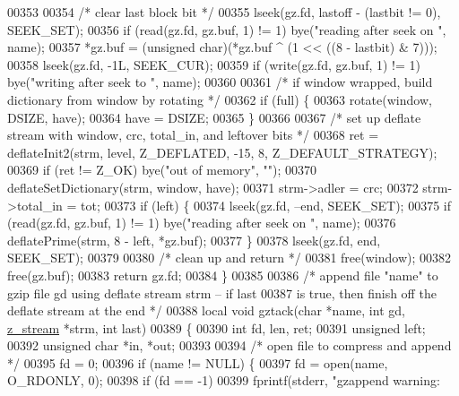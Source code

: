 \begin{DoxyCode}
{00353 
00354     \textcolor{comment}{/* clear last block bit */}
00355     lseek(gz.fd, lastoff - (lastbit != 0), SEEK\_SET);
00356     \textcolor{keywordflow}{if} (read(gz.fd, gz.buf, 1) != 1) bye(\textcolor{stringliteral}{"reading after seek on "}, name);
00357     *gz.buf = (\textcolor{keywordtype}{unsigned} char)(*gz.buf ^ (1 << ((8 - lastbit) & 7)));
00358     lseek(gz.fd, -1L, SEEK\_CUR);
00359     \textcolor{keywordflow}{if} (write(gz.fd, gz.buf, 1) != 1) bye(\textcolor{stringliteral}{"writing after seek to "}, name);
00360 
00361     \textcolor{comment}{/* if window wrapped, build dictionary from window by rotating */}
00362     \textcolor{keywordflow}{if} (full) \{
00363         rotate(window, DSIZE, have);
00364         have = DSIZE;
00365     \}
00366 
00367     \textcolor{comment}{/* set up deflate stream with window, crc, total\_in, and leftover bits */}
00368     ret = deflateInit2(strm, level, Z\_DEFLATED, -15, 8, Z\_DEFAULT\_STRATEGY);
00369     \textcolor{keywordflow}{if} (ret != Z\_OK) bye(\textcolor{stringliteral}{"out of memory"}, \textcolor{stringliteral}{""});
00370     deflateSetDictionary(strm, window, have);
00371     strm->adler = crc;
00372     strm->total\_in = tot;
00373     \textcolor{keywordflow}{if} (left) \{
00374         lseek(gz.fd, --end, SEEK\_SET);
00375         \textcolor{keywordflow}{if} (read(gz.fd, gz.buf, 1) != 1) bye(\textcolor{stringliteral}{"reading after seek on "}, name);
00376         deflatePrime(strm, 8 - left, *gz.buf);
00377     \}
00378     lseek(gz.fd, end, SEEK\_SET);
00379 
00380     \textcolor{comment}{/* clean up and return */}
00381     free(window);
00382     free(gz.buf);
00383     \textcolor{keywordflow}{return} gz.fd;
00384 \}
00385 
00386 \textcolor{comment}{/* append file "name" to gzip file gd using deflate stream strm -- if last}
00387 \textcolor{comment}{   is true, then finish off the deflate stream at the end */}
00388 local \textcolor{keywordtype}{void} gztack(\textcolor{keywordtype}{char} *name, \textcolor{keywordtype}{int} gd, \hyperlink{structz__stream__s}{z\_stream} *strm, \textcolor{keywordtype}{int} last)
00389 \{
00390     \textcolor{keywordtype}{int} fd, len, ret;
00391     \textcolor{keywordtype}{unsigned} left;
00392     \textcolor{keywordtype}{unsigned} \textcolor{keywordtype}{char} *in, *out;
00393 
00394     \textcolor{comment}{/* open file to compress and append */}
00395     fd = 0;
00396     \textcolor{keywordflow}{if} (name != NULL) \{
00397         fd = open(name, O\_RDONLY, 0);
00398         \textcolor{keywordflow}{if} (fd == -1)
00399             fprintf(stderr, \textcolor{stringliteral}{"gzappend warning: %
}}
\end{DoxyCode}
